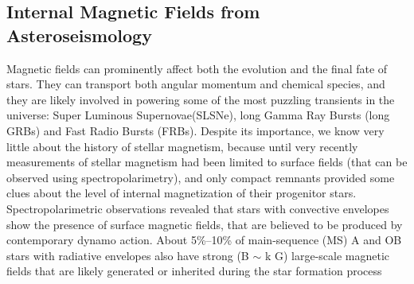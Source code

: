 {\color{red}\subsection{Internal Magnetic Fields from Asteroseismology}}
Magnetic fields can prominently affect both the evolution and the final fate of stars. They can transport both angular momentum and chemical species, and they are likely involved in powering some of the most puzzling transients in the universe: Super Luminous Supernovae(SLSNe), long Gamma Ray Bursts (long GRBs) and Fast Radio Bursts (FRBs). Despite its importance, we know very little about the history of stellar magnetism, because until very recently measurements of stellar magnetism had been limited to surface fields (that can be observed using spectropolarimetry), and only compact remnants provided some clues about the level of internal magnetization of their progenitor stars. Spectropolarimetric observations revealed that stars with convective envelopes show the presence of surface magnetic fields, that are believed to be produced by contemporary dynamo action. About 5\%–10\% of main-sequence (MS) A and OB stars with radiative envelopes also have strong (B $\sim$ k G) large-scale magnetic fields that are likely generated or inherited during the star formation process  \citep[fossil fields, see e.g.,][]{2012ASPC..464..405W}
